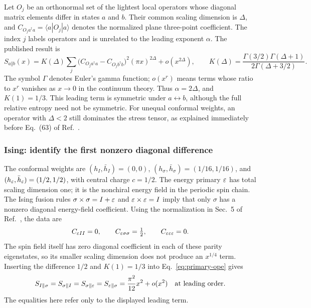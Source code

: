 Let $O_j$ be an orthonormal set of the lightest local operators whose
diagonal matrix elements differ in states $a$ and $b$. Their common
scaling dimension is $\Delta$, and
$C_{O_j a^\dagger a}=\langle a|O_j|a\rangle$ denotes the normalized
plane three-point coefficient. The index $j$ labels operators and is
unrelated to the leading exponent $\alpha$. The published result is
\begin{equation}
 S_{a\Vert b}(x)=K(\Delta)
 \sum_j\bigl(C_{O_j a^\dagger a}-C_{O_j b^\dagger b}\bigr)^2
 (\pi x)^{2\Delta}+o(x^{2\Delta}),\qquad
 K(\Delta)=\frac{\Gamma(3/2)\Gamma(\Delta+1)}
 {2\Gamma(\Delta+3/2)}.
 \label{eq:primary-ope}
\end{equation}
The symbol $\Gamma$ denotes Euler's gamma function; $o(x^r)$ means terms
whose ratio to $x^r$ vanishes as $x\to0$ in the continuum theory.
Thus $\alpha=2\Delta$, and $K(1)=1/3$. This leading term is symmetric
under $a\leftrightarrow b$, although the full relative entropy need not
be symmetric. For unequal conformal weights, an operator with
$\Delta<2$ still dominates the stress tensor, as explained immediately
before Eq.~(63) of Ref.~\cite{Sarosi}.

\subsubsection{Ising: identify the first nonzero diagonal difference}
The conformal weights are
$(h_I,\bar h_I)=(0,0)$,
$(h_\sigma,\bar h_\sigma)=(1/16,1/16)$, and
$(h_\varepsilon,\bar h_\varepsilon)=(1/2,1/2)$, with central charge $c=1/2$.
The energy primary $\varepsilon$ has total scaling dimension one; it is the
nonchiral energy field in the periodic spin chain. The Ising fusion
rules $\sigma\times\sigma=I+\varepsilon$ and $\varepsilon\times\varepsilon=I$ imply
that only $\sigma$ has a nonzero diagonal energy-field coefficient.
Using the normalization in Sec.~5 of Ref.~\cite{Sarosi}, the data are
\begin{equation}
 C_{\varepsilon II}=0,\qquad C_{\varepsilon\sigma\sigma}=\tfrac12,
 \qquad C_{\varepsilon\varepsilon\varepsilon}=0.
 \label{eq:primary-ising-ope-data}
\end{equation}
The spin field itself has zero diagonal coefficient
in each of these parity eigenstates, so its smaller scaling dimension
does not produce an $x^{1/4}$ term. Inserting the difference $1/2$
and $K(1)=1/3$ into Eq.~\eqref{eq:primary-ope} gives
\begin{equation}
 S_{I\Vert\sigma}=S_{\sigma\Vert I}
 =S_{\sigma\Vert\varepsilon}=S_{\varepsilon\Vert\sigma}
 =\frac{\pi^2}{12}x^2+o(x^2)
 \quad\text{at leading order}.
 \label{eq:primary-ising-spin}
\end{equation}
The equalities here refer only to the displayed leading term.

